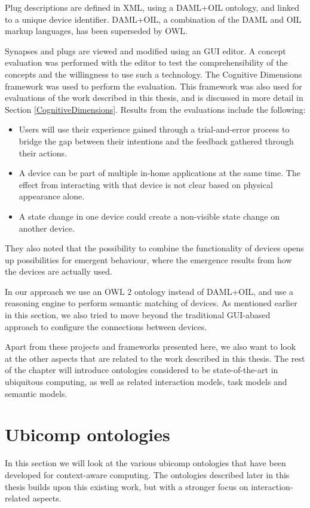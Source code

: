 Plug descriptions are defined in \ac{XML}, using a DAML+OIL ontology, and linked to a unique device identifier. DAML+OIL, a combination of the \ac{DAML} and \ac{OIL} markup languages, has been superseded by \ac{OWL}. 

Synapses and plugs are viewed and modified using an \ac{GUI} editor. A concept evaluation was performed with the editor to test the comprehensibility of the concepts and the willingness to use such a technology. The Cognitive Dimensions framework was used to perform the evaluation. This framework was also used for evaluations of the work described in this thesis, and is discussed in more detail in Section \ref{CognitiveDimensions}. Results from the evaluations include the following:

\begin{itemize}
	\item Users will use their experience gained through a trial-and-error process to bridge the gap between their intentions and the feedback gathered through their actions.
	\item A device can be part of multiple in-home applications at the same time. The effect from interacting with that device is not clear based on physical appearance alone.
	\item A state change in one device could create a non-visible state change on another device.
\end{itemize}

They also noted that the possibility to combine the functionality of devices opens up possibilities for emergent behaviour, where the emergence results from how the devices are actually used. 

In our approach we use an \ac{OWL} 2 ontology instead of DAML+OIL, and use a reasoning engine to perform semantic matching of devices. As mentioned earlier in this section, we also tried to move beyond the traditional \ac{GUI}-abased approach to configure the connections between devices. 

Apart from these projects and frameworks presented here, we also want to look at the other aspects that are related to the work described in this thesis. The rest of the chapter will introduce ontologies considered to be state-of-the-art  in ubiquitous computing, as well as related interaction models, task models and semantic models.

\section{Ubicomp ontologies}
\label{UbicompOntologies}
In this section we will look at the various ubicomp ontologies that have been developed for context-aware computing. The ontologies described later in this thesis builds upon this existing work, but with a stronger focus on interaction-related aspects. 
 
